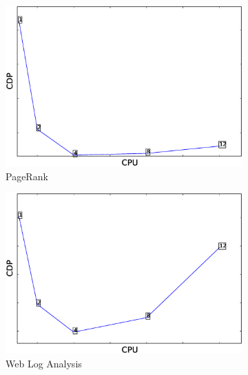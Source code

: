 \iffalse
\begin{figure}
	\captionsetup{justification=centering}
    \centering
	\begin{subfigure}[b]{0.3\textwidth}
        \includegraphics[width=\textwidth]{Chapter-8/figures/pagerank_cpu_CDP_12_1.eps}
        \caption{PageRank}
        \label{fig:pagerank_cdp}
    \end{subfigure}
    \begin{subfigure}[b]{0.3\textwidth}
        \includegraphics[width=\textwidth]{Chapter-8/figures/webloganalysis_cpu_CDP_12_1.eps}
        \caption{Web Log Analysis}
        \label{fig:webloganalysis_cdp}
    \end{subfigure}
    \begin{subfigure}[b]{0.3\textwidth}

\end{subfigure}
\end{figure}
